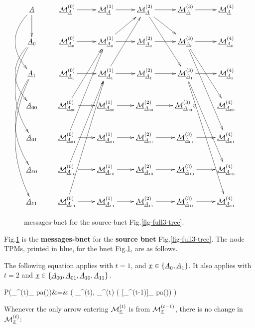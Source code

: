 \begin{figure}[h!]
\centering
$$\xymatrix{
\rvA\ar[d]\ar@/_2pc/[dd]
&\ucalm_\rvA^{(0)}
\ar[r]
&\ucalm_\rvA^{(1)}
\ar[r]
&\ucalm_\rvA^{(2)}\ar[rd]\ar[rdd]
\ar[r]
&\ucalm_\rvA^{(3)}
\ar[r]
&\ucalm_{\rvA}^{(4)}
\\
\rvA_{0}\ar@/_2pc/[dd]\ar@/_2pc/[ddd]
&\ucalm_{\rvA_{0}}^{(0)}
\ar[r]
&\ucalm_{\rvA_{0}}^{(1)}\ar[ru]
\ar[r]
&\ucalm_{\rvA_{0}}^{(2)}
\ar[r]
&\ucalm_{\rvA_{0}}^{(3)}
\ar[rdd]\ar[rddd]
\ar[r]
&\ucalm_{\rvA_{0}}^{(4)}
\\
\rvA_{1}\ar@/_2pc/[ddd]\ar@/_2pc/[dddd]
&\ucalm_{\rvA_{1}}^{(0)}
\ar[r]
&\ucalm_{\rvA_{1}}^{(1)}\ar[ruu]
\ar[r]
&\ucalm_{\rvA_{1}}^{(2)}
\ar[r]
&\ucalm_{\rvA_{1}}^{(3)}
\ar[rddd]\ar[rdddd]
\ar[r]
&\ucalm_{\rvA_{1}}^{(4)}
\\
\rvA_{00}
&\ucalm_{\rvA_{00}}^{(0)}\ar[ruu]
\ar[r]
&\ucalm_{\rvA_{00}}^{(1)}
\ar[r]
&\ucalm_{\rvA_{00}}^{(2)}
\ar[r]
&\ucalm_{\rvA_{00}}^{(3)}
v
&\ucalm_{\rvA_{00}}^{(4)}
\\
\rvA_{01}
&\ucalm_{\rvA_{01}}^{(0)}\ar[ruuu]
\ar[r]
&\ucalm_{\rvA_{01}}^{(1)}
\ar[r]
&\ucalm_{\rvA_{01}}^{(2)}
\ar[r]
&\ucalm_{\rvA_{01}}^{(3)}
\ar[r]
&\ucalm_{\rvA_{01}}^{(4)}
\\
\rvA_{10}
&\ucalm_{\rvA_{10}}^{(0)}\ar[ruuu]
\ar[r]
&\ucalm_{\rvA_{10}}^{(1)}
\ar[r]
&\ucalm_{\rvA_{10}}^{(2)}
\ar[r]
&\ucalm_{\rvA_{10}}^{(3)}
\ar[r]
&\ucalm_{\rvA_{10}}^{(4)}
\\
\rvA_{11}
&\ucalm_{\rvA_{11}}^{(0)}\ar[ruuuu]
\ar[r]
&\ucalm_{\rvA_{11}}^{(1)}
\ar[r]
&\ucalm_{\rvA_{11}}^{(2)}
\ar[r]
&\ucalm_{\rvA_{11}}^{(3)}
\ar[r]
&\ucalm_{\rvA_{11}}^{(4)}
}$$
\caption{messages-bnet
for the source-bnet
 Fig.\ref{fig-full3-tree}.}
\label{fig-mp-bnet-for-tree}
\end{figure}
Fig.\ref{fig-mp-bnet-for-tree} 
is the {\bf messages-bnet}
 for the 
{\bf source bnet} Fig.\ref{fig-full3-tree}.
The node TPMs,
printed in blue,
for the bnet
Fig.\ref{fig-mp-bnet-for-tree},
are as follows.


The following equation
applies with  $t=1$,
and ${\underline{x}}\in\{{\underline{A}}_0, {\underline{A}}_1\}$.
It also applies with
 $t=2$ and ${\underline{x}}\in\{
 {\underline{A}}_{00},{\underline{A}}_{01},
{\underline{A}}_{10},{\underline{A}}_{11}\}$.

\beqa\color{blue}
P(\calm_{\rvx}^{(t)}_
{\rva\in pa(\rvx)\cup \rvx})&=&\color{blue}
\delta(
\calm_{\rvx}^{(t)},
\calm_{\rvx}^{(t)}
( 
[\calm_{\rva}^{(t-1)}]_
{\rva\in pa(\rvx)\cup   \rvx})
)
\eeqa

Whenever the only arrow
entering ${\cal M}_{{\underline{x}}}^{(t)}$
is from ${\cal M}_{{\underline{x}}}^{(t-1)}$,
there is no change in ${\cal M}_{{\underline{x}}}^{(t)}$:

